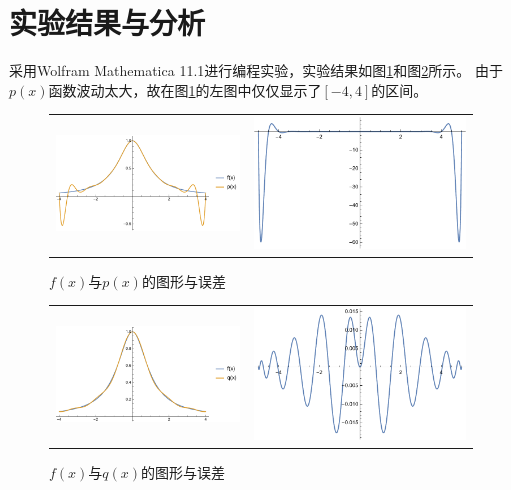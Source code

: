 \documentclass[reportComp]{thesis}
\begin{document}
\section{实验结果与分析}
采用Wolfram Mathematica 11.1进行编程实验，实验结果如图\ref{fig:px}和图\ref{fig:qx}所示。
由于$p(x)$函数波动太大，故在图\ref{fig:px}的左图中仅仅显示了$[-4,4]$的区间。
\begin{figure}[H]
\centering
\begin{tabular}{cc}
\includegraphics[width=0.5\linewidth]{px.pdf}&
\includegraphics[width=0.5\linewidth]{px-err.pdf}
\end{tabular}
\caption{$f(x)$与$p(x)$的图形与误差}
\label{fig:px}
\end{figure}
\begin{figure}[H]
\centering
\begin{tabular}{cc}
\includegraphics[width=0.5\linewidth]{qx.pdf}&
\includegraphics[width=0.5\linewidth]{qx-err.pdf}
\end{tabular}
\caption{$f(x)$与$q(x)$的图形与误差}
\label{fig:qx}
\end{figure}
\end{document}
